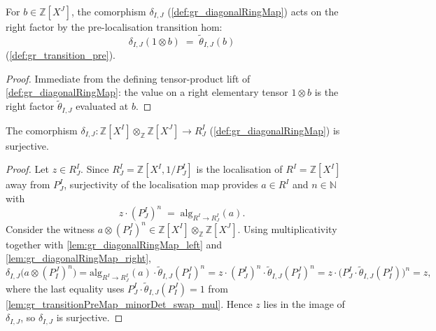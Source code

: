 \begin{lemma}

  \label{lem:gr_diagonalRingMap_right}
  For \(b \in \mathbb{Z}[X^J]\), the comorphism \(\delta_{I,J}\)
  (\cref{def:gr_diagonalRingMap}) acts on the right factor by the pre-localisation
  transition hom:
  \[
    \delta_{I,J}(1 \otimes b) \;=\; \tilde\theta_{I,J}(b)
  \]
  (\cref{def:gr_transition_pre}).
\end{lemma}
\begin{proof}
  \leanok
  Immediate from the defining tensor-product lift of
  \cref{def:gr_diagonalRingMap}: the value on a right elementary tensor \(1 \otimes
  b\) is the right factor \(\tilde\theta_{I,J}\) evaluated at \(b\).
\end{proof}

\begin{lemma}

  \label{lem:gr_diagonalRingMap_surjective}
  The comorphism \(\delta_{I,J} : \mathbb{Z}[X^I] \otimes_{\mathbb{Z}}
  \mathbb{Z}[X^J] \to R^I_J\) (\cref{def:gr_diagonalRingMap}) is surjective.
\end{lemma}
\begin{proof}
  \leanok
  Let \(z \in R^I_J\). Since \(R^I_J = \mathbb{Z}[X^I, 1/P^I_J]\) is the
  localisation of \(R^I = \mathbb{Z}[X^I]\) away from \(P^I_J\), surjectivity of
  the localisation map provides \(a \in R^I\) and \(n \in \mathbb{N}\) with
  \[
    z \cdot (P^I_J)^n \;=\; \mathrm{alg}_{R^I \to R^I_J}(a).
  \]
  Consider the witness \(a \otimes (P^J_I)^n \in \mathbb{Z}[X^I]
  \otimes_{\mathbb{Z}} \mathbb{Z}[X^J]\). Using multiplicativity together with
  \cref{lem:gr_diagonalRingMap_left} and \cref{lem:gr_diagonalRingMap_right},
  \[
    \delta_{I,J}\bigl(a \otimes (P^J_I)^n\bigr)
      = \mathrm{alg}_{R^I \to R^I_J}(a) \cdot \tilde\theta_{I,J}(P^J_I)^n
      = z \cdot (P^I_J)^n \cdot \tilde\theta_{I,J}(P^J_I)^n
      = z \cdot \bigl(P^I_J \cdot \tilde\theta_{I,J}(P^J_I)\bigr)^n
      = z,
  \]
  where the last equality uses \(P^I_J \cdot \tilde\theta_{I,J}(P^J_I) = 1\) from
  \cref{lem:gr_transitionPreMap_minorDet_swap_mul}. Hence \(z\) lies in the image
  of \(\delta_{I,J}\), so \(\delta_{I,J}\) is surjective.
\end{proof}


